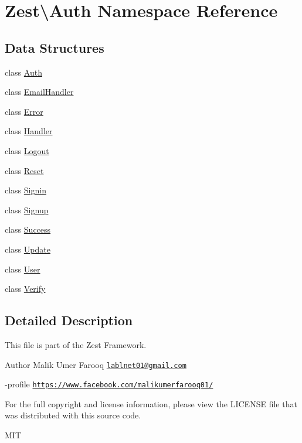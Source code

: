 \hypertarget{namespace_zest_1_1_auth}{}\section{Zest\textbackslash{}Auth Namespace Reference}
\label{namespace_zest_1_1_auth}
\subsection*{Data Structures}
\begin{DoxyCompactItemize}
\item 
class \mbox{\hyperlink{class_zest_1_1_auth_1_1_auth}{Auth}}
\item 
class \mbox{\hyperlink{class_zest_1_1_auth_1_1_email_handler}{Email\+Handler}}
\item 
class \mbox{\hyperlink{class_zest_1_1_auth_1_1_error}{Error}}
\item 
class \mbox{\hyperlink{class_zest_1_1_auth_1_1_handler}{Handler}}
\item 
class \mbox{\hyperlink{class_zest_1_1_auth_1_1_logout}{Logout}}
\item 
class \mbox{\hyperlink{class_zest_1_1_auth_1_1_reset}{Reset}}
\item 
class \mbox{\hyperlink{class_zest_1_1_auth_1_1_signin}{Signin}}
\item 
class \mbox{\hyperlink{class_zest_1_1_auth_1_1_signup}{Signup}}
\item 
class \mbox{\hyperlink{class_zest_1_1_auth_1_1_success}{Success}}
\item 
class \mbox{\hyperlink{class_zest_1_1_auth_1_1_update}{Update}}
\item 
class \mbox{\hyperlink{class_zest_1_1_auth_1_1_user}{User}}
\item 
class \mbox{\hyperlink{class_zest_1_1_auth_1_1_verify}{Verify}}
\end{DoxyCompactItemize}


\subsection{Detailed Description}
This file is part of the Zest Framework.

\begin{DoxyAuthor}{Author}
Malik Umer Farooq \href{mailto:lablnet01@gmail.com}{\tt lablnet01@gmail.\+com} 

-\/profile \href{https://www.facebook.com/malikumerfarooq01/}{\tt https\+://www.\+facebook.\+com/malikumerfarooq01/}
\end{DoxyAuthor}
For the full copyright and license information, please view the L\+I\+C\+E\+N\+SE file that was distributed with this source code.

M\+IT 